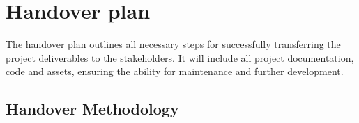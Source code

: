 \newpage
\section{Handover plan}
\label{section:handover_plan}

The handover plan outlines all necessary steps for successfully transferring the project deliverables to the stakeholders. It will include all project documentation, code and assets, ensuring the ability for maintenance and further development. 


\begin{comment}
\helper{How to deliver the product to the client and implement it into the environment it is meant for. The following subsections is an general simple example}

\noindent This Handover Plan outlines the systematic process of transferring all project deliverables, documentation, tools, and knowledge to the project owner at the end of the project or a project phase. The objective is to ensure a smooth transition, preserving all the hard work done on the project and providing a firm basis for future work. Understanding this plan will ensure that all team members know what is required in the final stages of the project.
\end{comment}

\subsection{Handover Methodology}

